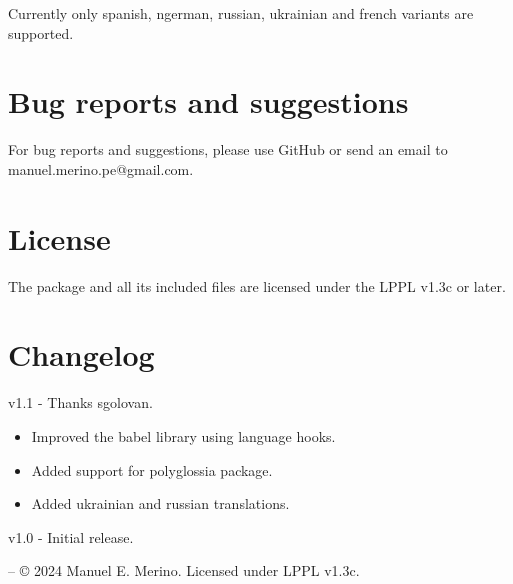 \documentclass[a4paper,12pt]{article}
\begin{document}
	Currently only spanish, ngerman, russian, ukrainian and french variants are supported.

	\section{Bug reports and suggestions}

	For bug reports and suggestions, please use GitHub or send an email to manuel.merino.pe@gmail.com.

	\section{License}

	The \tblrextras{} package and all its included files are licensed under the LPPL v1.3c or later.

	\section{Changelog}

	 v1.1 - Thanks sgolovan.
		\begin{itemize}
			\item Improved the babel library using language hooks.
			\item Added support for polyglossia package.
			\item Added ukrainian and russian translations.
		\end{itemize}

	v1.0 - Initial release.

	\vfill
	\centering
	\footnotesize \tblrextras{} -- {\copyright} 2024 Manuel E. Merino. Licensed under LPPL v1.3c.
\end{document}
